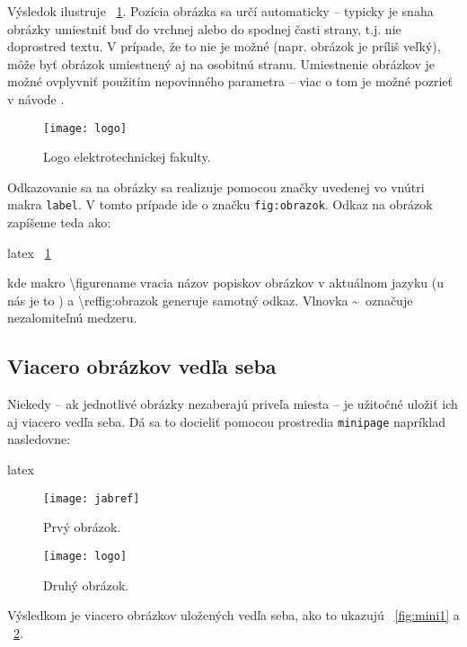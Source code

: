 Výsledok ilustruje \figurename~\ref{fig:obrazok}. Pozícia obrázka sa určí automaticky -- typicky je snaha obrázky umiestniť buď do vrchnej alebo do spodnej časti strany, t.j. nie doprostred textu. V prípade, že to nie je možné (napr. obrázok je príliš veľký), môže byť obrázok umiestnený aj na osobitnú stranu. Umiestnenie obrázkov je možné ovplyvniť použitím nepovinného parametra -- viac o tom je možné pozrieť v návode \cite{latexFigures}.

\begin{figure}
\centering
\texttt{[image: logo]}
\caption{Logo elektrotechnickej fakulty.}
\label{fig:obrazok}
\end{figure}

Odkazovanie sa na obrázky sa realizuje pomocou značky uvedenej vo vnútri makra \texttt{label}. V tomto prípade ide o značku \texttt{fig:obrazok}. Odkaz na obrázok zapíšeme teda ako:
\begin{inlinecode}{latex}
\figurename~\ref{fig:obrazok}
\end{inlinecode}
kde makro {\textbackslash}figurename vracia názov popiskov obrázkov v aktuálnom jazyku (u nás je to \figurename) a {\textbackslash}ref{fig:obrazok} generuje samotný odkaz. Vlnovka \textasciitilde\ označuje nezalomiteľnú medzeru.

\subsection{Viacero obrázkov vedľa seba}

Niekedy -- ak jednotlivé obrázky nezaberajú priveľa miesta -- je užitočné uložiť ich aj viacero vedľa seba. Dá sa to docieliť pomocou prostredia \texttt{minipage} napríklad nasledovne:
\begin{inlinecode}{latex}
\begin{figure}
\centering
\begin{minipage}[b]{0.58\textwidth}
\centering
\texttt{[image: jabref]}
\caption{Prvý obrázok.}
\label{fig:mini1}
\end{minipage}\quad
\begin{minipage}[b]{0.38\textwidth}
\centering
\texttt{[image: logo]}
\caption{Druhý obrázok.}
\label{fig:mini2}
\end{minipage}
\end{figure}
\end{inlinecode}

Výsledkom je viacero obrázkov uložených vedľa seba, ako to ukazujú \figurename~\ref{fig:mini1} a \figurename~\ref{fig:mini2}.

